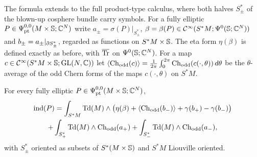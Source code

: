 The formula extends to the full product-type calculus, where both halves $S^*_\pm$ of the
blown-up cosphere bundle carry symbols. For a fully elliptic
$P\in\Psi^{0,0}_{\mathrm{pt}}(M\times\mathbb{S};\mathbb{C}^N)$ write $a_\pm=\sigma(P)|_{S^*_\pm}$,
$\beta=\beta(P)\in\mathcal{C}^\infty(S^*M;\Psi^{0}(\mathbb{S};\mathbb{C}^N))$ and $b_\pm=a_\pm|_{\partial S^*_\pm}$, regarded as
functions on $S^*M\times\mathbb{S}$. The eta form $\eta(\beta)$ is defined exactly as before, with
$\overline{\operatorname{Tr}}$ on $\Psi^{0}(\mathbb{S};\mathbb{C}^N)$. For a map $c\in\mathcal{C}^\infty(S^*M\times\mathbb{S};\operatorname{GL}(N,\mathbb{C}))$ let
$\langle\operatorname{Ch}_{\mathrm{odd}}(c)\rangle=\frac1{2\pi}\int_0^{2\pi}\operatorname{Ch}_{\mathrm{odd}}(c(\cdot,\theta))\,d\theta$ be the
$\theta$-average of the odd Chern forms of the maps $c(\cdot,\theta)$ on $S^*M$.

\begin{proposition}\label{eta:prop:full}
For every fully elliptic $P\in\Psi^{0,0}_{\mathrm{pt}}(M\times\mathbb{S};\mathbb{C}^N)$,
\begin{multline*}
\operatorname{ind}(P)=\int_{S^*M}\operatorname{Td}(M)\wedge\bigl(\eta(\beta)+\langle\operatorname{Ch}_{\mathrm{odd}}(b_-)\rangle+\gamma(b_+)-\gamma(b_-)\bigr)\\
+\int_{S^*_+}\operatorname{Td}(M)\wedge\operatorname{Ch}_{\mathrm{odd}}(a_+)+\int_{S^*_-}\operatorname{Td}(M)\wedge\operatorname{Ch}_{\mathrm{odd}}(a_-),
\end{multline*}
with $S^*_\pm$ oriented as subsets of $S^*(M\times\mathbb{S})$ and $S^*M$ Liouville
oriented.
\end{proposition}

